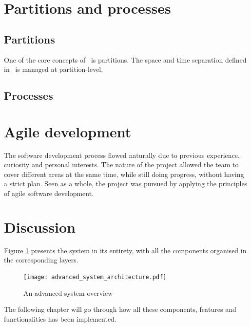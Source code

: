 \section{Partitions and processes}

\subsection{Partitions}
One of the core concepts of \arinc\ is partitions. The space and time separation
defined in \arinc\ is managed at partition-level.

\subsection{Processes}

\section{Agile development}
The software development process flowed naturally due to previous 
experience, curiosity and personal interests. The nature of the project
allowed the team to cover different areas at the same time, while still
doing progress, without having a strict plan. Seen as a whole, the project
was pursued by applying the principles of agile software development.

\section{Discussion}

Figure \ref{fig:advanced_system} presents the system in its entirety,
with all the components organised in the corresponding layers.

\begin{figure}[H]
\centering
\texttt{[image: advanced\_system\_architecture.pdf]}

\caption{An advanced system overview}
\label{fig:advanced_system}
\end{figure}

The following chapter will go through how all these components,
features and functionalities has been implemented.
